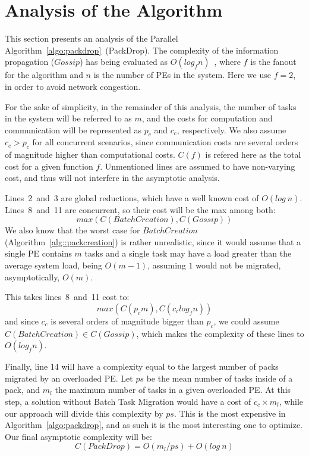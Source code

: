 \section{Analysis of the Algorithm}

This section presents an analysis of the Parallel Algorithm~\ref{algo:packdrop}~(PackDrop). 
The complexity of the information propagation ($Gossip$) has being evaluated as $O(log_fn)$~\cite{grapevine},
where $f$ is the fanout for the algorithm and $n$ is the number of PEs in the system.
Here we use $f=2$, in order to avoid network congestion. 

For the sake of simplicity, in the remainder of this analysis, the number of tasks in the system
will be referred to as $m$, and the costs for computation and communication will be represented as $p_c$ and $c_c$, respectively.
We also assume $c_c > p_c$ for all concurrent scenarios, since communication costs are several orders of magnitude higher than computational costs.
$C(f)$ is refered here as the total cost for a given function $f$.
Unmentioned lines are assumed to have non-varying cost, and thus will not interfere in the asymptotic analysis.

Lines~2~and~3 are global reductions, which have a well known cost of $O(log\ n)$.
Lines~8~and~11 are concurrent, so their cost will be the max among both:
\begin{equation}
  max(C(BatchCreation),C(Gossip))
\end{equation}
We also know that the worst case for $BatchCreation$ (Algorithm~\ref{alg::packcreation}) is rather unrealistic, 
since it would assume that a single PE contains $m$ tasks and a single task may have a load greater than the average system load, being $O(m-1)$, assuming $1$ would not be migrated, asymptotically, $O(m)$.

This takes lines~8~and~11 cost to:
\begin{equation}
 max(C(p_cm),C(c_clog_fn))
\end{equation}
and since $c_c$ is several orders of magnitude bigger than $p_c$, we could assume $C(BatchCreation)\in C(Gossip)$, which makes the 
complexity of these lines to $O(log_fn)$.

Finally, line 14 will have a complexity equal to the largest number of packs migrated by an overloaded PE.
Let $ps$ be the mean number of tasks inside of a pack, and $m_l$ the maximum number of tasks in a given overloaded PE.
At this step, a solution without Batch Task Migration would have a cost of $c_c\times m_l$, while our approach will divide this complexity by $ps$. 
This is the most expensive in Algorithm~\ref{algo:packdrop}, and as such it is the most interesting one to optimize.
Our final asymptotic complexity will be:
\begin{equation}
 C(PackDrop) = O(m_l/ps) + O(log\ n)
 \label{eq:worstcase}
\end{equation}

